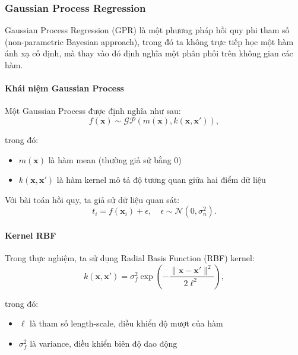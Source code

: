 \subsubsection{Gaussian Process Regression}

Gaussian Process Regression (GPR) là một phương pháp hồi quy phi tham số
(non-parametric Bayesian approach), trong đó ta không trực tiếp học một hàm ánh
xạ cố định, mà thay vào đó định nghĩa một phân phối trên không gian các hàm.

\paragraph{Khái niệm Gaussian Process}

Một Gaussian Process được định nghĩa như sau:
\begin{equation}
  f(\boldsymbol{x}) \sim \mathcal{GP}(m(\boldsymbol{x}), k(\boldsymbol{x},
  \boldsymbol{x}')),
\end{equation}

trong đó:
\begin{itemize}
  \item $m(\boldsymbol{x})$ là hàm mean (thường giả sử bằng 0)
  \item $k(\boldsymbol{x}, \boldsymbol{x}')$ là hàm kernel mô tả độ tương quan
    giữa hai điểm dữ liệu
\end{itemize}

Với bài toán hồi quy, ta giả sử dữ liệu quan sát:
\begin{equation}
  t_i = f(\boldsymbol{x}_i) + \epsilon, \quad \epsilon \sim \mathcal{N}(0,
  \sigma_n^2).
\end{equation}

\paragraph{Kernel RBF}

Trong thực nghiệm, ta sử dụng Radial Basis Function (RBF) kernel:
\begin{equation}
  k(\boldsymbol{x}, \boldsymbol{x}') = \sigma_f^2
  \exp\left(-\frac{\|\boldsymbol{x} - \boldsymbol{x}'\|^2}{2\ell^2}\right),
\end{equation}

trong đó:
\begin{itemize}
    \item $\ell$ là tham số length-scale, điều khiển độ mượt của hàm
    \item $\sigma_f^2$ là variance, điều khiển biên độ dao động
\end{itemize}

